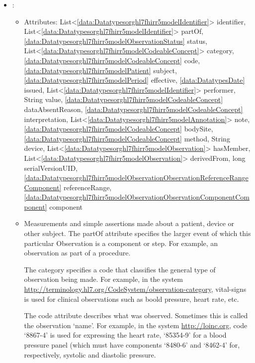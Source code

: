 \begin{itemize}[nolistsep,noitemsep]
\item {}: 
\begin{itemize}[noitemsep,nolistsep]
\item[] Attributes: List\textless{}\ref{data:Datatypesorghl7fhirr5modelIdentifier}\textgreater{} identifier, List\textless{}\ref{data:Datatypesorghl7fhirr5modelIdentifier}\textgreater{} partOf, \ref{data:Datatypesorghl7fhirr5modelObservationStatus} status, List\textless{}\ref{data:Datatypesorghl7fhirr5modelCodeableConcept}\textgreater{} category, \ref{data:Datatypesorghl7fhirr5modelCodeableConcept} code, \ref{data:Datatypesorghl7fhirr5modelPatient} subject, \ref{data:Datatypesorghl7fhirr5modelPeriod} effective, \ref{data:DatatypesDate} issued, List\textless{}\ref{data:Datatypesorghl7fhirr5modelIdentifier}\textgreater{} performer, String value, \ref{data:Datatypesorghl7fhirr5modelCodeableConcept} dataAbsentReason, \ref{data:Datatypesorghl7fhirr5modelCodeableConcept} interpretation, List\textless{}\ref{data:Datatypesorghl7fhirr5modelAnnotation}\textgreater{} note, \ref{data:Datatypesorghl7fhirr5modelCodeableConcept} bodySite, \ref{data:Datatypesorghl7fhirr5modelCodeableConcept} method, String device, List\textless{}\ref{data:Datatypesorghl7fhirr5modelObservation}\textgreater{} hasMember, List\textless{}\ref{data:Datatypesorghl7fhirr5modelObservation}\textgreater{} derivedFrom, long serialVersionUID, \ref{data:Datatypesorghl7fhirr5modelObservationObservationReferenceRangeComponent} referenceRange, \ref{data:Datatypesorghl7fhirr5modelObservationObservationComponentComponent} component
\item[] Measurements and simple assertions made about a patient, device or other subject.
The partOf attribute specifies the larger event of which this particular Observation is a component or step. For example, an observation as part of a procedure.

The category specifies a code that classifies the general type of observation being made.
For example, in the system \url{http://terminology.hl7.org/CodeSystem/observation-category}, vital-signs is used for clinical observations such as boold pressure, heart rate, etc.

The code attribute describes what was observed. Sometimes this is called the observation `name'.
For example, in the system \url{http://loinc.org}, code `8867-4' is used for expressing the heart rate, `85354-9' for a blood pressure panel (which must have components `8480-6' and `8462-4' for, respectively, systolic and diastolic pressure.


\end{itemize}
\end{itemize}
